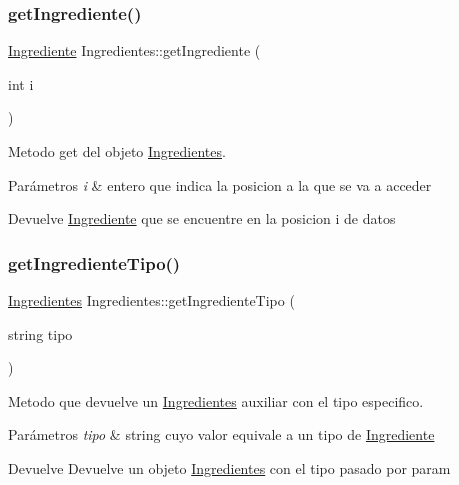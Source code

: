 \subsubsection{\texorpdfstring{get\+Ingrediente()}{getIngrediente()}}
{\footnotesize\ttfamily \hyperlink{classIngrediente}{Ingrediente} Ingredientes\+::get\+Ingrediente (\begin{DoxyParamCaption}\item[{int}]{i }\end{DoxyParamCaption})}



Metodo get del objeto \hyperlink{classIngredientes}{Ingredientes}. 


\begin{DoxyParams}{Parámetros}
{\em i} & entero que indica la posicion a la que se va a acceder \\
\hline
\end{DoxyParams}
\begin{DoxyReturn}{Devuelve}
\hyperlink{classIngrediente}{Ingrediente} que se encuentre en la posicion i de datos 
\end{DoxyReturn}
\mbox{\label{classIngredientes_a513a2a7af0995e893b288ca4cb4c49ef}} 
\subsubsection{\texorpdfstring{get\+Ingrediente\+Tipo()}{getIngredienteTipo()}}
{\footnotesize\ttfamily \hyperlink{classIngredientes}{Ingredientes} Ingredientes\+::get\+Ingrediente\+Tipo (\begin{DoxyParamCaption}\item[{string}]{tipo }\end{DoxyParamCaption})}



Metodo que devuelve un \hyperlink{classIngredientes}{Ingredientes} auxiliar con el tipo especifico. 


\begin{DoxyParams}{Parámetros}
{\em tipo} & string cuyo valor equivale a un tipo de \hyperlink{classIngrediente}{Ingrediente} \\
\hline
\end{DoxyParams}
\begin{DoxyReturn}{Devuelve}
Devuelve un objeto \hyperlink{classIngredientes}{Ingredientes} con el tipo pasado por param 
\end{DoxyReturn}
\mbox{\label{classIngredientes_a22513179fac0e797e685363677dcbaed}} 
